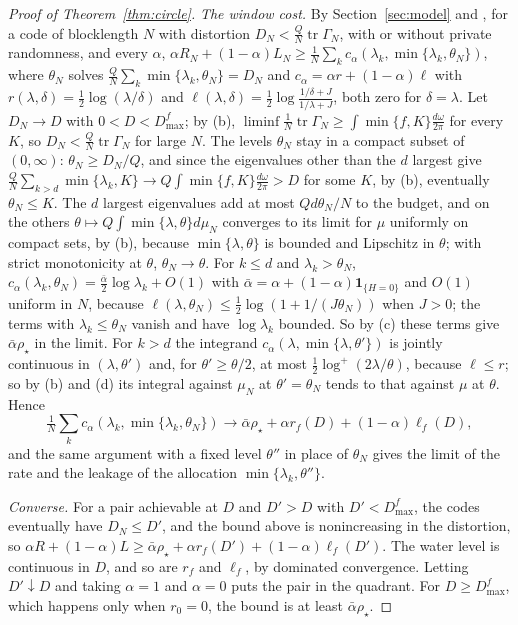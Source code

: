 \documentclass[11pt,onecolumn]{IEEEtran}
\newcommand{\tr}{\operatorname{tr}}
\newcommand{\dw}{\tfrac{d\omega}{2\pi}}
\begin{document}
\begin{proof}[Proof of Theorem~\ref{thm:circle}]
\emph{The window cost.} By Section~\ref{sec:model} and
\cite[Lemma~24]{part3}, for a code of blocklength $N$ with distortion
$D_N<\tfrac QN\tr\Gamma_N$, with or without private randomness, and every
$\alpha$,
$\alpha R_N+(1-\alpha)L_N\ge\tfrac1N\sum_kc_\alpha(\lambda_k,\min\{\lambda_k,\theta_N\})$,
where $\theta_N$ solves $\tfrac QN\sum_k\min\{\lambda_k,\theta_N\}=D_N$ and
$c_\alpha=\alpha r+(1-\alpha)\ell$ with
$r(\lambda,\delta)=\tfrac12\log(\lambda/\delta)$ and
$\ell(\lambda,\delta)=\tfrac12\log\frac{1/\delta+J}{1/\lambda+J}$, both zero
for $\delta=\lambda$. Let $D_N\to D$ with $0<D<D_{\max}^f$; by (b),
$\liminf\tfrac1N\tr\Gamma_N\ge\int\min\{f,K\}\dw$ for every $K$, so
$D_N<\tfrac QN\tr\Gamma_N$ for large $N$. The levels $\theta_N$ stay in a
compact subset of $(0,\infty)$: $\theta_N\ge D_N/Q$, and since the
eigenvalues other than the $d$ largest give
$\tfrac QN\sum_{k>d}\min\{\lambda_k,K\}\to Q\int\min\{f,K\}\dw>D$ for some
$K$, by (b), eventually $\theta_N\le K$. The $d$ largest eigenvalues add
at most $Qd\theta_N/N$ to the budget, and on the others
$\theta\mapsto Q\int\min\{\lambda,\theta\}d\mu_N$ converges to its limit for
$\mu$ uniformly on compact sets, by (b), because $\min\{\lambda,\theta\}$
is bounded and Lipschitz in $\theta$; with strict monotonicity at
$\theta$, $\theta_N\to\theta$. For $k\le d$ and $\lambda_k>\theta_N$,
$c_\alpha(\lambda_k,\theta_N)=\tfrac{\bar\alpha}2\log\lambda_k+O(1)$ with
$\bar\alpha=\alpha+(1-\alpha)\mathbf 1_{\{H=0\}}$ and $O(1)$ uniform in $N$,
because $\ell(\lambda,\theta_N)\le\tfrac12\log(1+1/(J\theta_N))$ when
$J>0$; the terms with $\lambda_k\le\theta_N$ vanish and have
$\log\lambda_k$ bounded. So by (c) these terms give $\bar\alpha\rho_\star$
in the limit. For $k>d$ the integrand
$c_\alpha(\lambda,\min\{\lambda,\theta'\})$ is jointly continuous in
$(\lambda,\theta')$ and, for $\theta'\ge\theta/2$, at most
$\tfrac12\log^+(2\lambda/\theta)$, because $\ell\le r$; so by (b) and (d)
its integral against $\mu_N$ at $\theta'=\theta_N$ tends to that against
$\mu$ at $\theta$. Hence
\[
\tfrac1N\sum_kc_\alpha(\lambda_k,\min\{\lambda_k,\theta_N\})\to\bar\alpha\rho_\star+\alpha r_f(D)+(1-\alpha)\ell_f(D),
\]
and the same argument with a fixed level $\theta''$ in place of
$\theta_N$ gives the limit of the rate and the leakage of the allocation
$\min\{\lambda_k,\theta''\}$.

\emph{Converse.} For a pair achievable at $D$ and $D'>D$ with
$D'<D_{\max}^f$, the codes eventually have $D_N\le D'$, and the bound
above is nonincreasing in the distortion, so
$\alpha R+(1-\alpha)L\ge\bar\alpha\rho_\star+\alpha r_f(D')+(1-\alpha)\ell_f(D')$.
The water level is continuous in $D$, and so are $r_f$ and $\ell_f$, by
dominated convergence. Letting $D'\downarrow D$ and taking $\alpha=1$ and
$\alpha=0$ puts the pair in the quadrant. For $D\ge D_{\max}^f$, which
happens only when $r_0=0$, the bound is at least $\bar\alpha\rho_\star$.


\end{proof}
\end{document}
